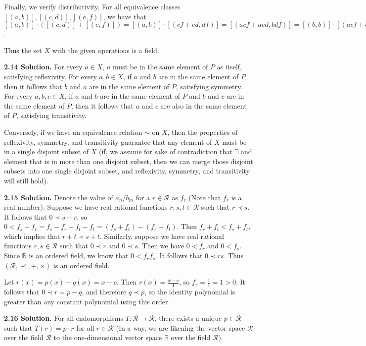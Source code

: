 Finally, we verify distributivity. For all equivalence classes $[(a,b)],[(c,d)],[(e,f)]$, we have that $[(a,b)]\cdot([(c,d)]+[(e,f)]) = [(a,b)]\cdot[(cf+ed,df)] = [(acf+aed, bdf)] = [(b,b)]\cdot[(acf+aed, bdf)] = [(acfb+aedf,bdfb)] = [(a,b)]\cdot[(c,d)]+[(a,b)]\cdot[(e,f)]$.

Thus the set $X$ with the given operations is a field.

\textbf{2.14 Solution.} For every $a\in X$, $a$ must be in the same element of $P$ as itself, satisfying reflexivity. For every $a,b\in X$, if $a$ and $b$ are in the same element of $P$ then it follows that $b$ and $a$ are in the same element of $P$, satisfying symmetry. For every $a,b,c\in X$, if $a$ and $b$ are in the same element of $P$ and $b$ and $c$ are in the same element of $P$, then it follows that $a$ and $c$ are also in the same element of $P$, satisfying transitivity.

Conversely, if we have an equivalence relation $\sim$ on $X$, then the properties of reflexivity, symmetry, and transitivity guarantee that any element of $X$ must be in a single disjoint subset of $X$ (if, we assume for sake of contradiction that $\exists$ and element that is in more than one disjoint subset, then we can merge those disjoint subsets into one single disjoint subset, and reflexivity, symmetry, and transitivity will still hold).

\textbf{2.15 Solution.} Denote the value of $a_n/b_m$ for a $r\in\mathcal{R}$ as $f_r$ (Note that $f_r$ is a real number). Suppose we have real rational functions $r,s,t\in\mathcal{R}$ such that $r\prec s$. It follows that $0\prec s-r$, so $0 < f_s-f_r=f_s-f_r+f_t-f_t=(f_s+f_t)-(f_r+f_t)$. Then $f_r+f_t < f_s+f_t$, which implies that $r+t\prec s+t$. Similarly, suppose we have real rational functions $r,s\in\mathcal{R}$ such that $0\prec r$ and $0\prec s$. Then we have $0 < f_r$ and $0 < f_s$. Since $\mathbb{R}$ is an ordered field, we know that $0 < f_rf_s$. It follows that $0\prec rs$. Thus $(\mathcal{R},\prec,+,\times)$ is an ordered field.

Let $r(x)=p(x)-q(x)=x-c$. Then $r(x)=\frac{x-c}{1}$, so $f_r=\frac{1}{1}=1>0$. It follows that $0\prec r=p-q$, and therefore $q\prec p$, so the identity polynomial is greater than any constant polynomial using this order.

\textbf{2.16 Solution.} For all endomorphisms $T:\mathcal{R}\to\mathcal{R}$, there exists a unique $p\in\mathcal{R}$ such that $T(r)=p\cdot r$ for all $r\in\mathcal{R}$ (In a way, we are likening the vector space $\mathcal{R}$ over the field $\mathcal{R}$ to the one-dimensional vector space $\mathbb{R}$ over the field $\mathcal{R}$).

